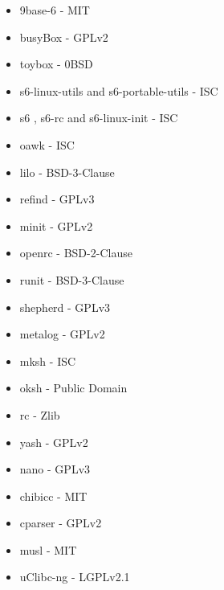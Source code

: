 \begin{itemize}
    \item 9base-6 \cite{9base} - MIT
    \item busyBox \cite{busybox} - GPLv2
    \item toybox \cite{toybox} - 0BSD
    \item s6-linux-utils \cite{s6-linux} and s6-portable-utils \cite{s6-portable} - ISC
    \item s6 \cite{s6}, s6-rc \cite{s6-rc} and s6-linux-init \cite{s6-linux-init} - ISC
    \item oawk \cite{oawk} - ISC
    \item lilo \cite{lilo} - BSD-3-Clause
    \item refind \cite{refind} - GPLv3
    \item minit \cite{minit} - GPLv2
    \item openrc \cite{openrc} - BSD-2-Clause
    \item runit \cite{runit} - BSD-3-Clause
    \item shepherd \cite{shepherd} - GPLv3
    \item metalog \cite{metalog} - GPLv2
    \item mksh \cite{mksh} - ISC
    \item oksh \cite{oksh} - Public Domain
    \item rc \cite{rc} - Zlib
    \item yash \cite{yash} - GPLv2
    \item nano \cite{nano} - GPLv3
    \item chibicc \cite{chibicc} - MIT
    \item cparser \cite{cparser} - GPLv2
    \item musl \cite{musl} - MIT
    \item uClibc-ng \cite{uclibc-ng} - LGPLv2.1
\end{itemize}
